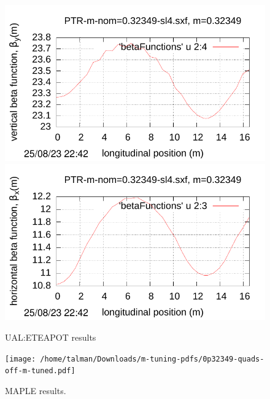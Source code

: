 \documentclass[]{article}
\begin{document}
\begin{figure}[htbp]
\hspace{-0.6cm}
\begin{minipage}[b]{0.49\linewidth}
\centering
\includegraphics[scale=0.5]{pdf/Fig_II-7.pdf}
\includegraphics[scale=0.5]{pdf/Fig_II-5.pdf}
\caption{UAL:ETEAPOT results\hfill}
\label{fig:UAL-PTR-m=0.29447}
\end{minipage}
\begin{minipage}[b]{0.49\linewidth}
\centering
\texttt{[image: /home/talman/Downloads/m-tuning-pdfs/0p32349-quads-off-m-tuned.pdf]}
\caption{MAPLE results.\hfill}
\label{fig:MAPLE-PTR-m=0.32349}
\end{minipage}
\end{figure}
%
%
\end{document}
